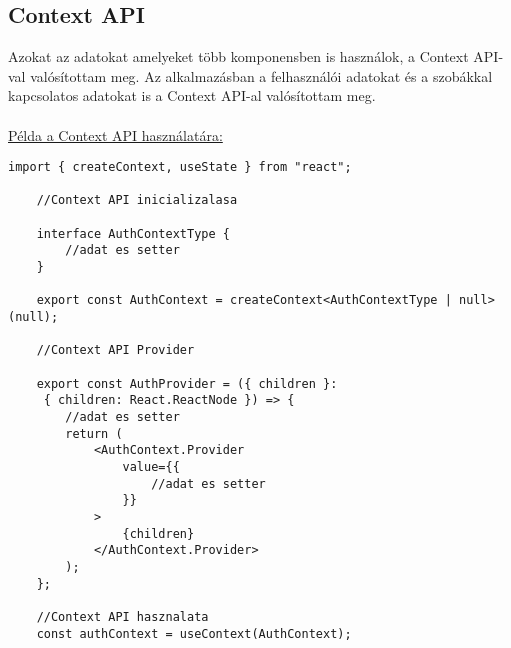 \subsection*{Context API}
Azokat az adatokat amelyeket több komponensben is használok, a Context API-val valósítottam meg.
Az alkalmazásban a felhasználói adatokat és a szobákkal kapcsolatos adatokat is a Context API-al valósítottam meg.
\\
\\
\underline{Példa a Context API használatára:}
\begin{lstlisting}[style=es6,caption={Context API}]
    import { createContext, useState } from "react";

    //Context API inicializalasa
    
    interface AuthContextType {
        //adat es setter
    }

    export const AuthContext = createContext<AuthContextType | null>(null);

    //Context API Provider

    export const AuthProvider = ({ children }:
     { children: React.ReactNode }) => {
        //adat es setter
        return (
            <AuthContext.Provider
                value={{
                    //adat es setter
                }}
            >
                {children}
            </AuthContext.Provider>
        );
    };

    //Context API hasznalata
    const authContext = useContext(AuthContext);
\end{lstlisting}
\vspace{1em}
